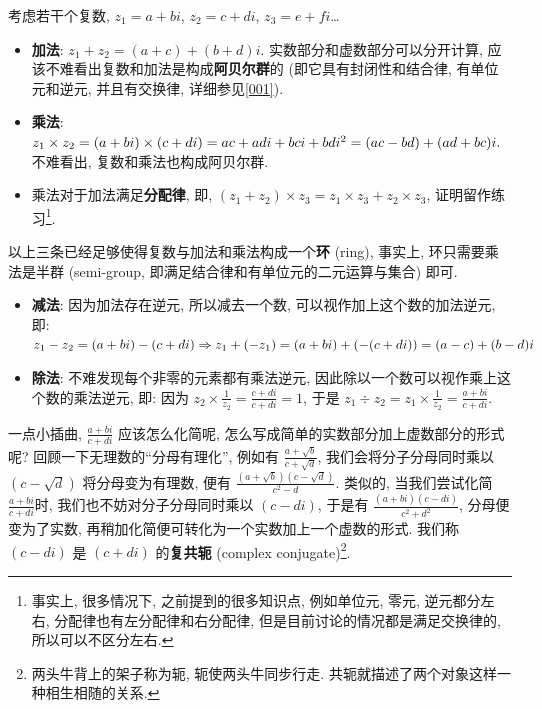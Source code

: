 \begin{tcolorbox}[size=fbox, breakable, enhanced jigsaw, title={运算规律}]

考虑若干个复数, $z_1=a+bi$, $z_2=c+di$, $z_3=e+fi$\ldots{}

\begin{itemize}

\item
  \textbf{加法}: $z_1+z_2=(a+c)+(b+d)i$.
  实数部分和虚数部分可以分开计算,
  应该不难看出复数和加法是构成\textbf{阿贝尔群}的
  (即它具有封闭性和结合律, 有单位元和逆元, 并且有交换律, 详细参见\ref{001}).
\item
  \textbf{乘法}:
  $z_1\times z_2=(a+bi)\times(c+di)\\=ac+adi+bci+bdi^2=(ac-bd)+(ad+bc)i.$
  不难看出, 复数和乘法也构成阿贝尔群.
\item
  乘法对于加法满足\textbf{分配律}, 即,
  $(z_1+z_2)\times z_3=z_1\times z_3+z_2\times z_3$,
  证明留作练习\footnote{事实上, 很多情况下, 之前提到的很多知识点,
    例如单位元, 零元, 逆元都分左右, 分配律也有左分配律和右分配律,
    但是目前讨论的情况都是满足交换律的, 所以可以不区分左右.}.
\end{itemize}

以上三条已经足够使得复数与加法和乘法构成一个\textbf{环} (ring), 事实上,
环只需要乘法是半群 (semi-group, 即满足结合律和有单位元的二元运算与集合) 即可.

\begin{itemize}

\item
  \textbf{减法}: 因为加法存在逆元, 所以减去一个数,
  可以视作加上这个数的加法逆元, 即:
  $z_1-z_2=(a+bi)-(c+di)\\\Rightarrow z_1+(-z_1)=(a+bi)+(-(c+di))=(a-c)+(b-d)i$
\item
  \textbf{除法}: 不难发现每个非零的元素都有乘法逆元,
  因此除以一个数可以视作乘上这个数的乘法逆元, 即: 因为
  $z_2\times\frac{1}{z_2}=\frac{c+di}{c+di}=1$, 于是
  $z_1\div z_2=z_1\times\frac{1}{z_2}=\frac{a+bi}{c+di}$.
\end{itemize}

\begin{newquote}
一点小插曲, $\frac{a+bi}{c+di}$ 应该怎么化简呢,
怎么写成简单的实数部分加上虚数部分的形式呢?
回顾一下无理数的``分母有理化'', 例如有
$\frac{a+\sqrt{b}}{c+\sqrt{d}}$, 我们会将分子分母同时乘以
$(c-\sqrt{d})$ 将分母变为有理数, 便有
$\frac{(a+\sqrt{b})(c-\sqrt{d})}{c^2-d}$. 类似的, 当我们尝试化简
$\frac{a+bi}{c+di}$时, 我们也不妨对分子分母同时乘以 $(c-di)$, 于是有
$\frac{(a+bi)(c-di)}{c^2+d^2}$, 分母便变为了实数,
再稍加化简便可转化为一个实数加上一个虚数的形式. 我们称 $(c-di)$ 是
$(c+di)$ 的\textbf{复共轭} (complex conjugate)\footnote{两头牛背上的架子称为轭,
  轭使两头牛同步行走. 共轭就描述了两个对象这样一种相生相随的关系.}.
\end{newquote}


\end{tcolorbox}
